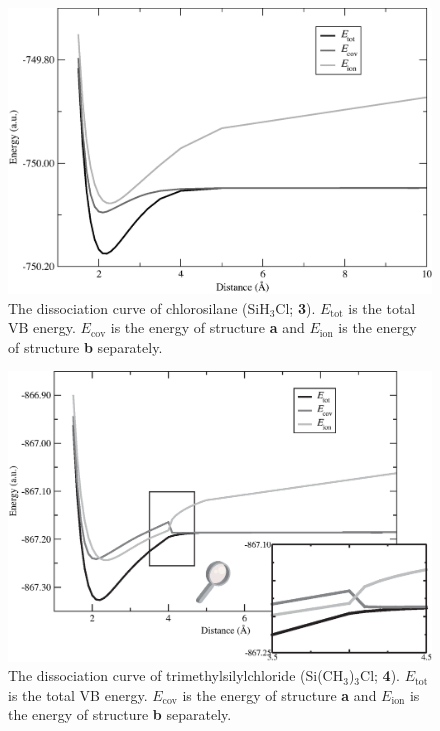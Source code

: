 \begin{figure}[htbp]
\begin{center}
\includegraphics[scale=0.55]{dissociation/figures/sih3cl_g.eps}
\end{center}
\caption{The dissociation curve of chlorosilane (SiH$_3$Cl; \textbf{3}). $E_\mathrm{tot}$ is the total VB energy. $E_\mathrm{cov}$ is the energy of structure \textbf{a} and $E_\mathrm{ion}$ is the energy of structure \textbf{b} separately.}
\label{ch3.fig.sih3cl}
\end{figure}
\begin{figure}[hbtp]
\begin{center}
\includegraphics[scale=0.70]{dissociation/figures/c3h9sicl_g.eps}
\end{center}
\caption{The dissociation curve of trimethylsilylchloride (Si(CH$_3$)$_3$Cl; \textbf{4}). $E_\mathrm{tot}$ is the total VB energy. $E_\mathrm{cov}$ is the energy of structure \textbf{a} and $E_\mathrm{ion}$ is the energy of structure \textbf{b} separately. }
\label{ch3.fig.c3h9sicl}
\end{figure}
